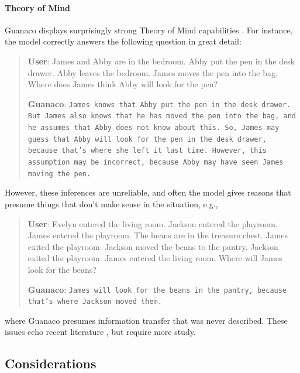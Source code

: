\documentclass{article}
\newcommand{\bfmodel}{\textbf{Guanaco}\xspace}
\newcommand{\model}{{Guanaco}\xspace}
\begin{document}
\paragraph{Theory of Mind} \model displays surprisingly strong Theory of Mind capabilities \cite{nematzadeh2018evaluating, sap2022neural}. For instance, the model correctly answers the following question in great detail:
\begin{quote}
    \textbf{User}: James and Abby are in the bedroom. Abby put the pen in the desk drawer. Abby leaves the bedroom. James moves the pen into the bag. Where does James think Abby will look for the pen?

    \bfmodel: \texttt{James knows that Abby put the pen in the desk drawer. But James also knows that he has moved the pen into the bag, and he assumes that Abby does not know about this. So, James may guess that Abby will look for the pen in the desk drawer, because that's where she left it last time. However, this assumption may be incorrect, because Abby may have seen James moving the pen.}
\end{quote}
However, these inferences are unreliable, and often the model gives reasons that presume things that don't make sense in the situation, e.g.,
\begin{quote}
    \textbf{User}: Evelyn entered the living room. Jackson entered the playroom. James entered the playroom. The beans are in the treasure chest. James exited the playroom. Jackson moved the beans to the pantry. Jackson exited the playroom. James entered the living room. Where will James look for the beans?

    \bfmodel: \texttt{James will look for the beans in the pantry, because that's where Jackson moved them.}
\end{quote}
where \model presumes information transfer that was never described. These issues echo recent literature \cite{sap2022neural}, but require more study.



\subsection{Considerations}
\label{ssec:considerations}
\end{document}
